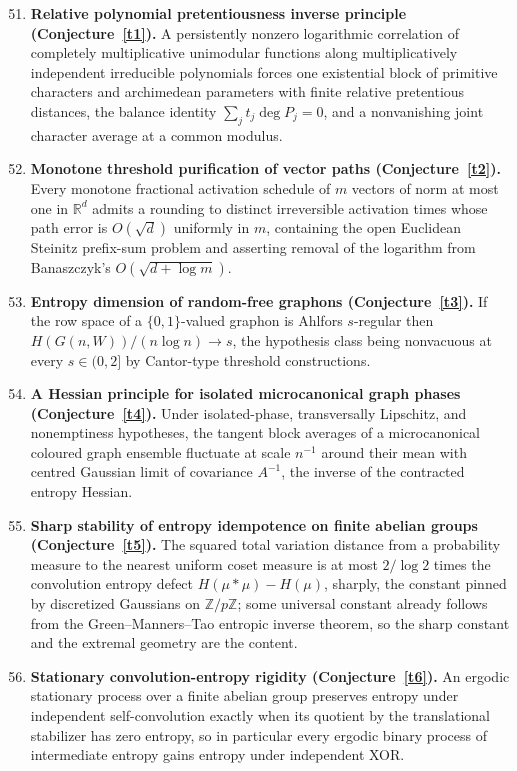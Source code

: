 \documentclass[11pt]{article}
\theoremstyle{definition}
\newcommand{\Z}{\mathbb Z}
\newcommand{\R}{\mathbb R}
\providecommand{\Z}{\mathbb Z}
\providecommand{\R}{\mathbb R}
\begin{document}
\begin{enumerate}\setcounter{enumi}{50}
\item \textbf{Relative polynomial pretentiousness inverse principle (Conjecture~\ref{t1}).} A persistently nonzero logarithmic correlation of completely multiplicative unimodular functions along multiplicatively independent irreducible polynomials forces one existential block of primitive characters and archimedean parameters with finite relative pretentious distances, the balance identity $\sum_j t_j \deg P_j = 0$, and a nonvanishing joint character average at a common modulus.
\item \textbf{Monotone threshold purification of vector paths (Conjecture~\ref{t2}).} Every monotone fractional activation schedule of $m$ vectors of norm at most one in $\R^d$ admits a rounding to distinct irreversible activation times whose path error is $O(\sqrt d)$ uniformly in $m$, containing the open Euclidean Steinitz prefix-sum problem and asserting removal of the logarithm from Banaszczyk's $O(\sqrt{d+\log m})$.
\item \textbf{Entropy dimension of random-free graphons (Conjecture~\ref{t3}).} If the row space of a $\{0,1\}$-valued graphon is Ahlfors $s$-regular then $H(G(n,W))/(n\log n)\to s$, the hypothesis class being nonvacuous at every $s\in(0,2]$ by Cantor-type threshold constructions.
\item \textbf{A Hessian principle for isolated microcanonical graph phases (Conjecture~\ref{t4}).} Under isolated-phase, transversally Lipschitz, and nonemptiness hypotheses, the tangent block averages of a microcanonical coloured graph ensemble fluctuate at scale $n^{-1}$ around their mean with centred Gaussian limit of covariance $A^{-1}$, the inverse of the contracted entropy Hessian.
\item \textbf{Sharp stability of entropy idempotence on finite abelian groups (Conjecture~\ref{t5}).} The squared total variation distance from a probability measure to the nearest uniform coset measure is at most $2/\log 2$ times the convolution entropy defect $H(\mu*\mu)-H(\mu)$, sharply, the constant pinned by discretized Gaussians on $\Z/p\Z$; some universal constant already follows from the Green--Manners--Tao entropic inverse theorem, so the sharp constant and the extremal geometry are the content.
\item \textbf{Stationary convolution-entropy rigidity (Conjecture~\ref{t6}).} An ergodic stationary process over a finite abelian group preserves entropy under independent self-convolution exactly when its quotient by the translational stabilizer has zero entropy, so in particular every ergodic binary process of intermediate entropy gains entropy under independent XOR.
\end{enumerate}
\end{document}
